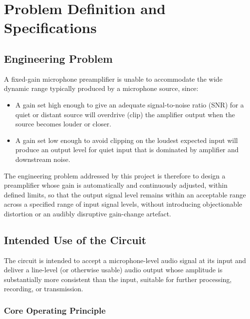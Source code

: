 \chapter{Problem Definition and Specifications}
\label{ch:problem}

\section{Engineering Problem}

A fixed-gain microphone preamplifier is unable to accommodate the wide dynamic range typically produced by a microphone source, since:
\begin{itemize}
    \item A gain set high enough to give an adequate signal-to-noise ratio (SNR) for a quiet or distant source will overdrive (clip) the amplifier output when the source becomes louder or closer.
    \item A gain set low enough to avoid clipping on the loudest expected input will produce an output level for quiet input that is dominated by amplifier and downstream noise.
\end{itemize}

The engineering problem addressed by this project is therefore to design a preamplifier whose gain is automatically and continuously adjusted, within defined limits, so that the output signal level remains within an acceptable range across a specified range of input signal levels, without introducing objectionable distortion or an audibly disruptive gain-change artefact.

\section{Intended Use of the Circuit}

The circuit is intended to accept a microphone-level audio signal at its input and deliver a line-level (or otherwise usable) audio output whose amplitude is substantially more consistent than the input, suitable for further processing, recording, or transmission. 

\subsection{Core Operating Principle}


